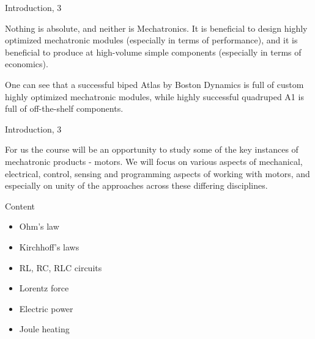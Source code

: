\documentclass{beamer}
\begin{document}
\begin{frame}{Introduction, 3}
	\begin{flushleft}
		
		Nothing is absolute, and neither is Mechatronics. It is beneficial to design highly optimized mechatronic modules (especially in terms of performance), and it is beneficial to produce at high-volume simple components (especially in terms of economics).
		
		\bigskip
		
		One can see that a successful biped Atlas by Boston Dynamics is full of custom highly optimized mechatronic modules, while highly successful quadruped A1 is full of off-the-shelf components.
		
	\end{flushleft}
\end{frame}




\begin{frame}{Introduction, 3}
	\begin{flushleft}
		
		For us the course will be an opportunity to study some of the key instances of mechatronic products - motors. We will focus on various aspects of mechanical, electrical, control, sensing and programming aspects of working with motors, and especially on unity of the approaches across these differing disciplines.
		
	\end{flushleft}
\end{frame}



\begin{frame}{Content}
\begin{itemize}
\item Ohm's law
\item Kirchhoff's laws
\item RL, RC, RLC circuits
\item Lorentz force
\item Electric power
\item Joule heating
\end{itemize}
\end{frame}
\end{document}
